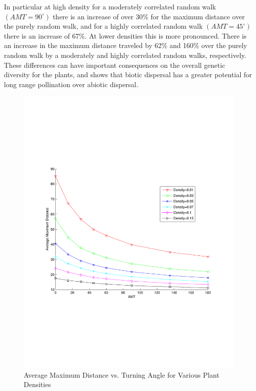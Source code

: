 In particular at high density for a moderately correlated random walk $(AMT=90^{\circ})$ there is an increase of over 30\% for the maximum distance over the purely random walk, and for a highly correlated random walk $(AMT=45^{\circ})$ there is an increase of 67\%.  At lower densities this is more pronounced.  There is an increase in the maximum distance traveled by 62\% and 160\% over the purely random walk by a moderately and highly correlated random walks, respectively. These differences can have important consequences on the overall genetic diversity for the plants, and shows that biotic dispersal has a greater potential for long range pollination over abiotic dispersal.  

\begin{figure}
  \begin{center}
  \includegraphics[scale=0.5, trim=50 240 50 300]{MaxDVsAMT.pdf}
  \end{center}
  \caption{\small Average Maximum Distance vs. Turning Angle for Various Plant Densities}
  \label{AvgMaxDBees}
\end{figure}

